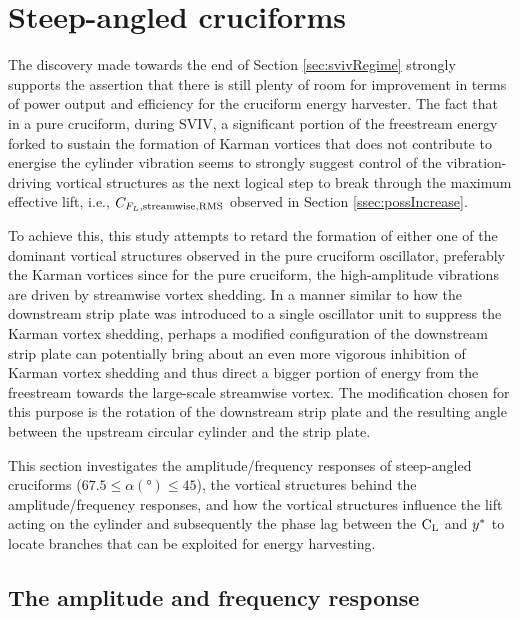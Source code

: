 \documentclass[oneside]{utmthesis}
\begin{document}
\section{Steep-angled cruciforms}\label{sec:transitionToKarman}

The discovery made towards the end of Section \ref{sec:svivRegime} strongly supports the assertion that there is still plenty of room for improvement in terms of power output and efficiency for the cruciform energy harvester. The fact that in a pure cruciform, during SVIV, a significant portion of the freestream energy forked to sustain the formation of Karman vortices that does not contribute to energise the cylinder vibration seems to strongly suggest control of the vibration-driving vortical structures as the next logical step to break through the maximum effective lift, i.e., $C_{F_{L},\text{streamwise},\text{RMS}}$ observed in Section \ref{ssec:possIncrease}.

To achieve this, this study attempts to retard the formation of either one of the dominant vortical structures observed in the pure cruciform oscillator, preferably the Karman vortices since for the pure cruciform, the high-amplitude vibrations are driven by streamwise vortex shedding. In a manner similar to how the downstream strip plate was introduced to a single oscillator unit to suppress the Karman vortex shedding, perhaps a modified configuration of the downstream strip plate can potentially bring about an even more vigorous inhibition of Karman vortex shedding and thus direct a bigger portion of energy from the freestream towards the large-scale streamwise vortex. The modification chosen for this purpose is the rotation of the downstream strip plate and the resulting angle between the upstream circular cylinder and the strip plate.

This section investigates the amplitude/frequency responses of steep-angled cruciforms ($67.5 \leq \alpha (\si{\degree}) \leq 45$), the vortical structures behind the amplitude/frequency responses, and how the vortical structures influence the lift acting on the cylinder and subsequently the phase lag between the $\text{C}_{\text{L}}$ and $y^{*}$ to locate branches that can be exploited for energy harvesting.

\subsection{The amplitude and frequency response}\label{ssec:transRegimeAmpFreqResp}
\end{document}
